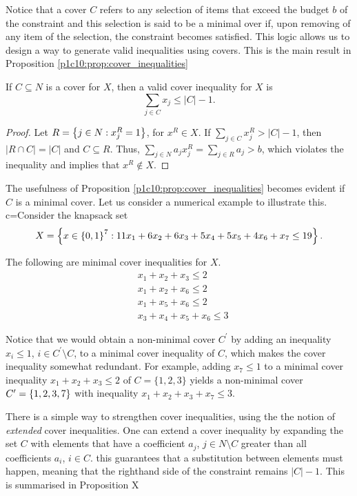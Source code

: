 Notice that a cover $C$ refers to any selection of items that exceed the budget $b$ of the constraint and this selection is said to be a minimal over if, upon removing of any item of the selection, the constraint becomes satisfied. This logic allows us to design a way to generate valid inequalities using covers. This is the main result in Proposition \ref{p1c10:prop:cover_inequalities}
\begin{proposition} \label{p1c10:prop:cover_inequalities}
	If $C \subseteq N$ is a cover for $X$, then a valid cover inequality for $X$ is
	\begin{equation*}
		\sum_{j \in C} x_j \leq |C|-1.		
	\end{equation*}
\end{proposition}

\begin{proof} 
	Let $R = \left\{ j \in N : x^R_j = 1 \right \}$, for $x^R \in X$. If $\sum_{j \in C}x_j^R > |C|-1$, then $|R \cap C| = |C|$ and $C \subseteq R$. Thus, $\sum_{j\in N}a_j x_j^R = \sum_{j\in R}a_j > b$, which violates the inequality and implies that $x^R \notin X$.  
\end{proof}

The usefulness of Proposition \ref{p1c10:prop:cover_inequalities} becomes evident if $C$ is a minimal cover. Let us consider a numerical example to illustrate this. c=Consider the knapsack set 
%
\begin{equation*}
	X = \left\{ x \in \left\{ 0,1 \right \}^7 : 11x_1 + 6x_2 + 6x_3 + 5x_4 + 5x_5 + 4x_6 + x_7 \leq 19 \right \}.	
\end{equation*}

The following are minimal cover inequalities for $X$. 
%
\begin{align*}
&x_1 + x_2 + x_3 \leq 2\\
&x_1 + x_2 +x_6 \leq 2\\
&x_1 + x_5 + x_6 \leq 2\\
&x_3 + x_4 + x_5 + x_6 \leq 3
\end{align*}

Notice that we would obtain a non-minimal cover $C^\prime$ by adding an inequality $x_i \leq 1$, $i \in C^\prime\setminus C$, to a minimal cover inequality of $C$, which makes the cover inequality somewhat redundant. For example, adding $x_7 \leq 1$ to a minimal cover inequality $x_1 + x_2 + x_3 \leq 2$ of $C = \{1,2,3\}$ yields a non-minimal cover $C^\prime = \left\{ 1,2,3,7 \right \}$ with inequality $x_1 + x_2 + x_3 + x_7 \leq 3$.

There is a simple way to strengthen cover inequalities, using the the notion of \emph{extended} cover inequalities. One can extend a cover inequality by expanding the set $C$ with elements that have a coefficient $a_j$, $j \in N \setminus C$ greater than all coefficients $a_i$, $i \in C$. this guarantees that a substitution between elements must happen, meaning that the righthand side of the constraint remains $|C| - 1$. This is summarised in Proposition X

